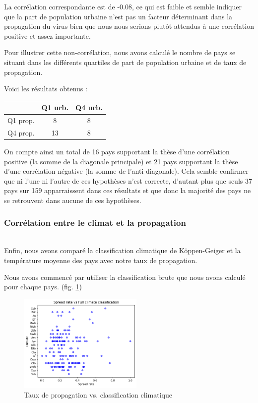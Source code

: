 \documentclass[12pt]{iEEEtran}
\begin{document}
La corrélation correspondante est de -0.08, ce qui est faible et semble indiquer que la part de population
urbaine n'est pas un facteur déterminant dans la propagation du virus bien que nous nous serions
plutôt attendus à une corrélation positive et assez importante.

Pour illustrer cette non-corrélation, nous avons calculé le nombre de pays se situant dans les
différents quartiles de part de population urbaine et de taux de propagation.

Voici les résultats obtenus :

\begin{table}[h]
    \centering
    \begin{tabular}{|c|c|c|}
        \hline
        & Q1 urb. & Q4 urb. \\
        \hline
        Q1 prop. & 8 & 8 \\
        \hline
        Q4 prop. & 13 & 8 \\
        \hline
    \end{tabular}
\end{table}

On compte ainsi un total de 16 pays supportant la thèse d'une corrélation positive 
(la somme de la diagonale principale) et 21 pays supportant la thèse d'une corrélation négative
(la somme de l'anti-diagonale). Cela semble confirmer que ni l'une ni l'autre
de ces hypothèses n'est correcte, d'autant plus que seuls 37 pays sur 159 apparraissent dans
ces résultats et que donc la majorité des pays ne se retrouvent dans aucune de ces hypothèses.
\\

\subsubsection{Corrélation entre le climat et la propagation}\hfill\\

Enfin, nous avons comparé la classification climatique de Köppen-Geiger et la température moyenne
des pays avec notre taux de propagation.

Nous avons commencé par utiliser la classification brute que nous avons calculé pour chaque pays. (fig. \ref{fig:spread_clim})

\begin{figure}[h]
    \centering
    \includegraphics[width=6cm]{img/spread_clim.png}
    \caption{Taux de propagation vs. classification climatique}
    \label{fig:spread_clim}
\end{figure}
\end{document}
